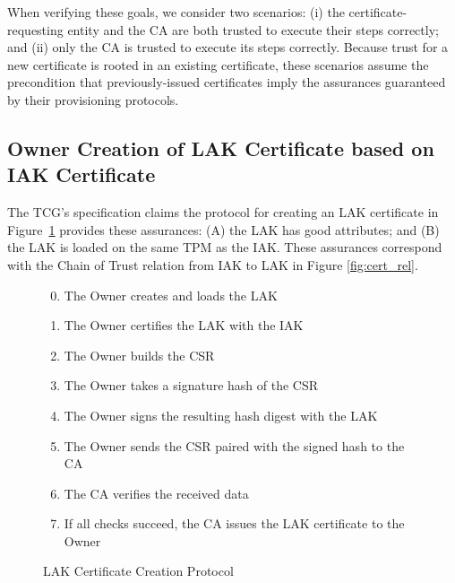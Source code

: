 \documentclass[runningheads]{llncs}
\begin{document}
When verifying these goals, we consider two scenarios: (i) the
certificate-requesting entity and the CA are both trusted to execute
their steps correctly; and (ii) only the CA is trusted to execute its
steps correctly.  Because trust for a new certificate is rooted in an
existing certificate, these scenarios assume the precondition that
previously-issued certificates imply the assurances guaranteed by
their provisioning protocols.

\subsection{Owner Creation of LAK Certificate based on IAK Certificate}

The TCG's specification claims the protocol for creating an LAK
certificate in Figure~\ref{fig:lak-certificate-creation} provides
these assurances: (A) the LAK has good attributes; and (B) the LAK is
loaded on the same TPM as the IAK. These assurances correspond with
the Chain of Trust relation from IAK to LAK in Figure \ref{fig:cert_rel}.

\begin{figure}[hpbt]
\begin{enumerate}[itemsep=0pt,parsep=0pt,partopsep=0pt]
  \setcounter{enumi}{-1}
  \item The Owner creates and loads the LAK
  \item The Owner certifies the LAK with the IAK
  \item The Owner builds the CSR%
  \item The Owner takes a signature hash of the CSR
  \item The Owner signs the resulting hash digest with the LAK
  \item The Owner sends the CSR paired with the signed hash to the CA
  \item The CA verifies the received data%
  \item If all checks succeed, the CA issues the LAK certificate to the Owner
  \end{enumerate}
  \caption{LAK Certificate Creation Protocol}
  \label{fig:lak-certificate-creation}
\end{figure}
\end{document}
